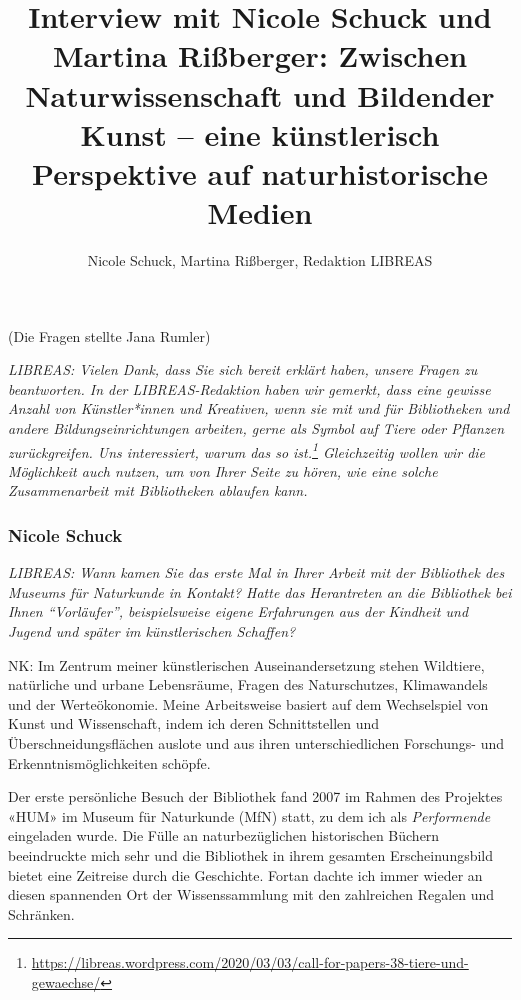 \documentclass[a4paper,
fontsize=11pt,
oneside,
numbers=noperiodatend,
parskip=half-,
bibliography=totoc,
final
]{scrartcl}
\title{\LARGE{Interview mit Nicole Schuck und Martina Rißberger: Zwischen Naturwissenschaft und Bildender Kunst – eine künstlerisch Perspektive auf naturhistorische Medien}}%
\author{Nicole Schuck, Martina Rißberger, Redaktion LIBREAS} %
\date{}
\begin{document}
\maketitle
\thispagestyle{fancyplain} 


(Die Fragen stellte Jana Rumler)

\emph{LIBREAS: Vielen Dank, dass Sie sich bereit erklärt haben, unsere
Fragen zu beantworten. In der LIBREAS-Redaktion haben wir gemerkt, dass
eine gewisse Anzahl von Künstler*innen und Kreativen, wenn sie mit und
für Bibliotheken und andere Bildungseinrichtungen arbeiten, gerne als
Symbol auf Tiere oder Pflanzen zurückgreifen. Uns interessiert, warum
das so ist.\footnote{\url{https://libreas.wordpress.com/2020/03/03/call-for-papers-38-tiere-und-gewaechse/}}
Gleichzeitig wollen wir die Möglichkeit auch nutzen, um von Ihrer Seite
zu hören, wie eine solche Zusammenarbeit mit Bibliotheken ablaufen
kann.}

\hypertarget{nicole-schuck}{%
\subsubsection{Nicole Schuck}\label{nicole-schuck}}

\emph{LIBREAS: Wann kamen Sie das erste Mal in Ihrer Arbeit mit der
Bibliothek des Museums für Naturkunde in Kontakt? Hatte das Herantreten
an die Bibliothek bei Ihnen \enquote{Vorläufer}, beispielsweise eigene
Erfahrungen aus der Kindheit und Jugend und später im künstlerischen
Schaffen?}

NK: Im Zentrum meiner künstlerischen Auseinandersetzung stehen
Wildtiere, natürliche und urbane Lebensräume, Fragen des Naturschutzes,
Klimawandels und der Werteökonomie. Meine Arbeitsweise basiert auf dem
Wechselspiel von Kunst und Wissenschaft, indem ich deren Schnittstellen
und Überschneidungsflächen auslote und aus ihren unterschiedlichen
Forschungs- und Erkenntnismöglichkeiten schöpfe.

Der erste persönliche Besuch der Bibliothek fand 2007 im Rahmen des
Projektes «HUM» im Museum für Naturkunde (MfN) statt, zu dem ich als
\emph{Performende} eingeladen wurde. Die Fülle an naturbezüglichen
historischen Büchern beeindruckte mich sehr und die Bibliothek in ihrem
gesamten Erscheinungsbild bietet eine Zeitreise durch die Geschichte.
Fortan dachte ich immer wieder an diesen spannenden Ort der
Wissenssammlung mit den zahlreichen Regalen und Schränken.
\end{document}
